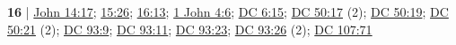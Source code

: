 \begin{compactdesc}
		\item[spirit of truth] \textbf{16} | \hyperref[JOHN-14-17]{John 14:17}; \hyperref[JOHN-15-26]{15:26}; \hyperref[JOHN-16-13]{16:13}; \hyperref[1JOHN-4-6]{1 John 4:6}; \hyperref[DC6-15]{DC 6:15}; \hyperref[DC50-17]{DC 50:17} (2); \hyperref[DC50-19]{DC 50:19}; \hyperref[DC50-21]{DC 50:21} (2); \hyperref[DC93-9]{DC 93:9}; \hyperref[DC93-11]{DC 93:11}; \hyperref[DC93-23]{DC 93:23}; \hyperref[DC93-26]{DC 93:26} (2); \hyperref[DC107-71]{DC 107:71}
			
	\end{compactdesc}
	


	
	
	
